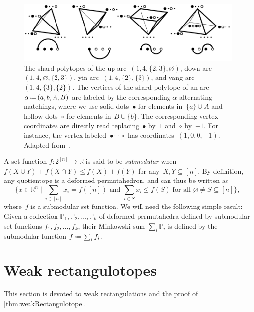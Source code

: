 \documentclass{amsart}
\theoremstyle{definition}
\newcommand{\R}{\mathbb{R}} %
\newcommand{\Bigset}[2]{\Big\{ #1 \;\Big|\; #2 \Big\}} %
\newcommand{\eqdef}{\mbox{\,\raisebox{0.2ex}{\scriptsize\ensuremath{\mathrm:}}\ensuremath{=}\,}} %
\newcommand{\darkblue}{\color{darkblue}} %
\newcommand{\defn}[1]{\textsl{\darkblue #1}} %
\newcommand{\polytope}[1]{\mathds{#1}} %
\begin{document}
\begin{figure}
	\capstart
	\centerline{\includegraphics[scale=1]{shardPolytopes}}
	\caption{The shard polytopes of the up arc~$(1, 4, \{2, 3\}, \varnothing)$, down arc~$(1, 4, \varnothing, \{2, 3\})$, yin arc~$(1, 4, \{2\}, \{3\})$, and yang arc~$(1, 4, \{3\}, \{2\})$. The vertices of the shard polytope of an arc~$\alpha \eqdef (a, b, A, B)$ are labeled by the corresponding $\alpha$-alternating matchings, where we use solid dots~$\bullet$ for elements in~$\{a\} \cup A$ and hollow dots~$\circ$ for elements in~$B \cup \{b\}$. The corresponding vertex coordinates are directly read replacing~$\bullet$ by~$1$ and~$\circ$ by~$-1$. For instance, the vertex labeled~${\bullet \cdot \cdot \,\circ}$ has coordinates~$(1,0,0,-1)$. Adapted from~\cite[Fig.~10]{MR4584712}.}
	\label{fig:shardPolytopes}
\end{figure}

\pagebreak
A set function $f:2^{[n]}\mapsto \R$ is said to be \defn{submodular} when $f(X \cup Y) + f(X \cap Y) \le f(X) + f(Y)$ for any~$X, Y \subseteq [n]$.
By definition, any quotientope is a deformed permutahedron, and can thus be written as
  \[
  \Bigset{x \in \R^n}{ \sum_{i \in [n]} x_i = f([n]) \text{ and } \sum_{i \in S} x_i \le f(S) \text{ for all } \varnothing \ne S \subseteq [n]},
  \]
where~$f$ is a submodular set function.
We will need the following simple result: Given a collection $\polytope{P}_1, \polytope{P}_2,\ldots ,\polytope{P}_k$ of deformed permutahedra defined by submodular set functions $f_1,f_2,\ldots ,f_k$, their Minkowski sum $\sum_i \polytope{P}_i$ is defined by the submodular function $f \eqdef \sum_i f_i$.


\section{Weak rectangulotopes}
\label{sec:weakRectangulotopes}

This section is devoted to weak rectangulations and the proof of \cref{thm:weakRectangulotope}.
\end{document}
